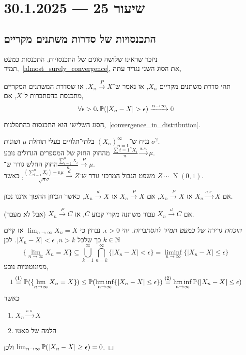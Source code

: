 \section{שיעור 25 --- 30.1.2025}
\subsection{התכנסויות של סדרות משתנים מקריים}
ניזכר שראינו שלושה סוגים של התכנסויות, התכנסות כמעט תמיד,\ \ref{almost_surely_convergence},
את הסוג השני נגדיר עתה,
\begin{definition}
	תהי סדרת משתנים מקריים $X_n$, אז נאמר ש־$X_n \xrightarrow{P} X$, או שסדרת המשתנים המקריים מתכנסת בהסתברות ל־$X$, אם,
	\[
		\forall \epsilon > 0,
		\mathbb{P}(|X_n - X| > \epsilon) \xrightarrow{n \to \infty} 0
	\]
\end{definition}
הסוג השלישי הוא התכנסות בהתפלגות,\ \ref{convergence_in_distribution}.
\begin{example}
	נניח ש־${(X_n)}_{n = 1}^\infty$ בלתי־תלויים בעלי תוחלת $\mu$ ושונות $\sigma^2$. \\
	מהחוק החזק של המספרים הגדולים נובע $\frac{\sum{i = 1}^n X_i}{n} \xrightarrow{a.s.} \mu$. \\
	החוק החלש גורר ש־$\frac{\sum_{i = 1}^{n} X_i}{n} \xrightarrow{P} \mu$. \\
	משפט הגבול המרכזי גורר ש־$\frac{\left( \sum_{i = 1}^{n} X_i \right) - n\mu}{\sqrt{n} \sigma} \xrightarrow{d} Z$,
	כאשר $Z \sim \operatorname{N}(0, 1)$.
\end{example}
\begin{theorem}
	אם $X_n \xrightarrow{a.s.} X$ אז $X_n \xrightarrow{P} X$,
	אם $X_n \xrightarrow{P} X$ אז $X_n \xrightarrow{d} X$,
	כאשר הכיוון ההפוך איננו נכון.

	אם $X_n \xrightarrow{d} C$ עבור משתנה מקרי קבוע $C$, אז $X_n \xrightarrow{P} C$ (אבל לא מעבר).
\end{theorem}
\begin{proof}[הוכחת גרירה של כמעט תמיד להסתברות]
	יהי $\epsilon > 0$.
	נבחין כי $\lim_{n \to \infty} X_n = X$ אז קיים $k \in \mathbb{N}$ כך שלכל $n > k$, $|X_n - X| < \epsilon$.
	לכן
	\[
		\{ \lim_{n \to \infty} X_n = X \}
		\subseteq \bigcup_{k = 1}^\infty \bigcap_{n = k}^\infty \{ |X_n - X| < \epsilon \}
		= \liminf_{n \to \infty} \{ |X_n - X| \le \epsilon \}
	\]
	ממונוטוניות נובע,
	\[
		1 \overset{(1)}{=}
		\mathbb{P}(\{ \lim_{n \to \infty} X_n = X \})
		\le \mathbb{P}(\liminf_{n \to \infty} \{ |X_n - X| \le \epsilon \})
		\overset{(2)}{=} \liminf_{n \to \infty} \mathbb{P}(|X_n - X| \le \epsilon)
	\]
	כאשר
	\begin{enumerate}
		\item $X_n \xrightarrow{a.s.} X$
		\item הלמה של פאטו
	\end{enumerate}
	ולכן $\lim_{n \to \infty} \mathbb{P}(|X_n - X| \ge \epsilon) = 0$.
\end{proof}

